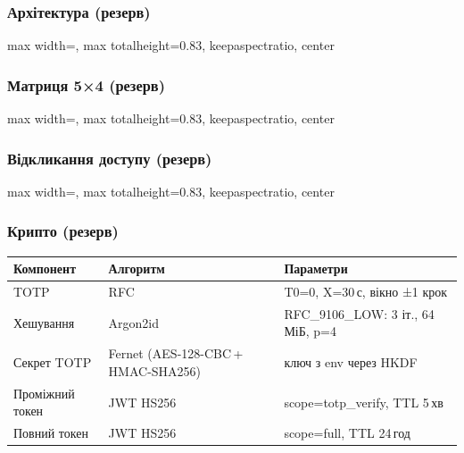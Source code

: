 \documentclass[aspectratio=43,14pt]{beamer}
\newcommand{\tstretch}[1]{\renewcommand{\arraystretch}{#1}}
\newcommand{\fitfig}[1]{%
  \begin{adjustbox}{max width=\textwidth, max totalheight=0.83\textheight,
                    keepaspectratio, center}%
  \end{adjustbox}%
}
\begin{document}
\appendix

\begin{frame}[c]
  \frametitle{Архітектура (резерв)}
  \fitfig{fig-architecture}
\end{frame}

\begin{frame}[c]
  \frametitle{Матриця 5×4 (резерв)}
  \fitfig{fig-matrix5}
\end{frame}

\begin{frame}[c]
  \frametitle{Відкликання доступу (резерв)}
  \fitfig{fig-planes}
\end{frame}

\begin{frame}
  \frametitle{Крипто (резерв)}
  \centering
  \vspace*{0.5em}
  {\small
  \tstretch{1.45}
  \begin{tabularx}{\textwidth}{@{}l>{\raggedright\arraybackslash}X>{\raggedright\arraybackslash}X@{}}
    \toprule
    \textbf{Компонент} & \textbf{Алгоритм} & \textbf{Параметри} \\
    \midrule
    TOTP
      & RFC\;6238
      & T0=0, X=30\,с, вікно ±1 крок \\
    Хешування
      & Argon2id
      & RFC\_9106\_LOW: 3 іт., 64\,МіБ, p=4 \\
    Секрет TOTP
      & Fernet (AES-128-CBC\,+\,HMAC-SHA256)
      & ключ з env через HKDF \\
    Проміжний токен
      & JWT HS256
      & scope=totp\_verify, TTL 5\,хв \\
    Повний токен
      & JWT HS256
      & scope=full, TTL 24\,год \\
    \bottomrule
  \end{tabularx}
  }
\end{frame}
\end{document}
